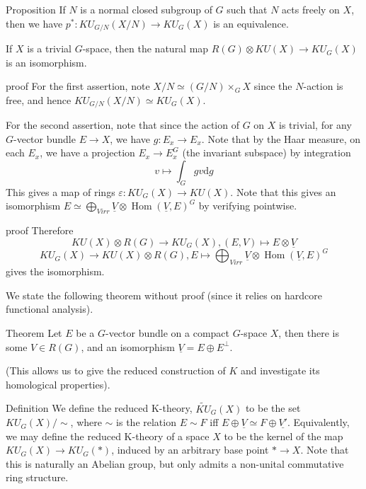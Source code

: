\documentclass{beamer}
\DeclareMathOperator{\Hom}{\mathrm{Hom}}
\newcommand{\der}{\mathrm{d}}
\begin{document}
\begin{frame}
	\begin{block}{Proposition}
		If $N$ is a normal closed subgroup of $G$ such that $N$ acts freely on $X$, then we have $p^*:KU_{G/N}(X/N)\to KU_G(X)$ is an equivalence. 

		If $X$ is a trivial $G$-space, then the natural map $R(G)\otimes KU(X)\to KU_G(X)$ is an isomorphism. 
	\end{block}
\end{frame}

\begin{frame}
	\begin{block}{proof}
		For the first assertion, note $X/N\simeq(G/N)\times_GX$ since the $N$-action is free, and hence $KU_{G/N}(X/N)\simeq KU_G(X)$. 

		For the second assertion, note that since the action of $G$ on $X$ is trivial, for any $G$-vector bundle $E\to X$, we have $g:E_x\to E_x$. Note that by the Haar measure, on each $E_x$, we have a projection $E_x\to E_x^G$ (the invariant subspace) by integration 
		\[ v\mapsto\int_Ggv\der g \]
		This gives a map of rings $\varepsilon:KU_G(X)\to KU(X)$. Note that this gives an isomorphism $E\simeq\bigoplus_{V irr}\underline{V}\otimes\Hom(\underline{V},E)^G$ by verifying pointwise. 
	\end{block}
\end{frame}

\begin{frame}
	\begin{block}{proof}
		Therefore 
		\[ KU(X)\otimes R(G)\to KU_G(X), (E,V)\mapsto E\otimes\underline{V} \]
		\[ KU_G(X)\to KU(X)\otimes R(G), E\mapsto\bigoplus_{V irr}\underline{V}\otimes\Hom(\underline{V},E)^G \]
		gives the isomorphism. 
	\end{block}
\end{frame}

\begin{frame}
	We state the following theorem without proof (since it relies on hardcore functional analysis). 
	\begin{alertblock}{Theorem}
		Let $E$ be a $G$-vector bundle on a compact $G$-space $X$, then there is some $V\in R(G)$, and an isomorphism $\underline{V}=E\oplus E^{\perp}$. 
	\end{alertblock}
	(This allows us to give the reduced construction of $K$ and investigate its homological properties). 
\end{frame}

\begin{frame}
	\begin{block}{Definition}
		We define the reduced K-theory, $\widetilde{KU}_G(X)$ to be the set $KU_G(X)/\sim$, where $\sim$ is the relation $E\sim F$ iff $E\oplus\underline{V}\simeq F\oplus\underline{V'}$. Equivalently, we may define the reduced K-theory of a space $X$ to be the kernel of the map $KU_G(X)\to KU_G(*)$, induced by an arbitrary base point $*\to X$. Note that this is naturally an Abelian group, but only admits a non-unital commutative ring structure. 
	\end{block}

\end{frame}
\end{document}
